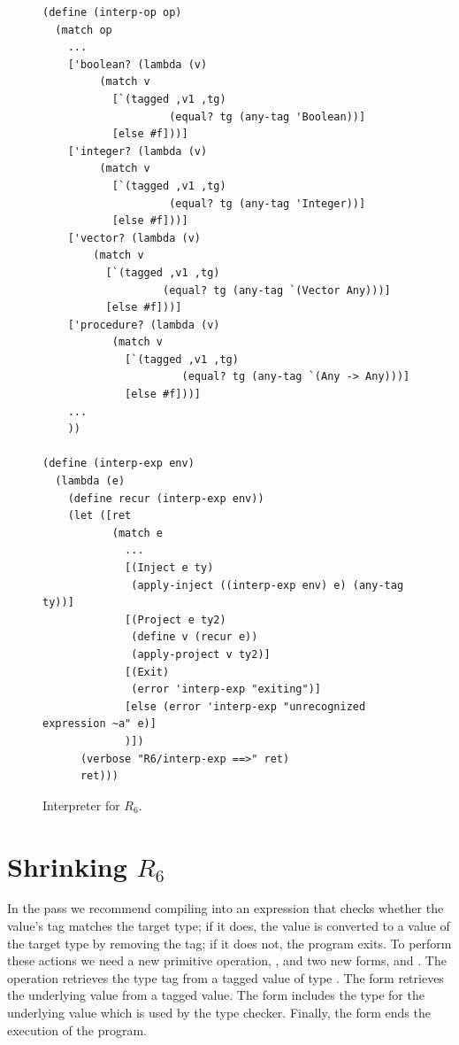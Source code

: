 \documentclass[11pt]{book}
\begin{document}
\begin{figure}[btp]
\begin{lstlisting}
(define (interp-op op)
  (match op
    ...
    ['boolean? (lambda (v)
		 (match v
		   [`(tagged ,v1 ,tg)
                    (equal? tg (any-tag 'Boolean))]
		   [else #f]))]
    ['integer? (lambda (v)
		 (match v
		   [`(tagged ,v1 ,tg)
                    (equal? tg (any-tag 'Integer))]
		   [else #f]))]
    ['vector? (lambda (v)
		(match v
		  [`(tagged ,v1 ,tg)
                   (equal? tg (any-tag `(Vector Any)))]
		  [else #f]))]
    ['procedure? (lambda (v)
		   (match v
		     [`(tagged ,v1 ,tg)
                      (equal? tg (any-tag `(Any -> Any)))]
		     [else #f]))]
    ...
    ))

(define (interp-exp env)
  (lambda (e)
    (define recur (interp-exp env))
    (let ([ret
           (match e
             ...
             [(Inject e ty)
              (apply-inject ((interp-exp env) e) (any-tag ty))]
             [(Project e ty2)
              (define v (recur e))
              (apply-project v ty2)]
             [(Exit)
              (error 'interp-exp "exiting")]
             [else (error 'interp-exp "unrecognized expression ~a" e)]
             )])
      (verbose "R6/interp-exp ==>" ret)
      ret)))
\end{lstlisting}
\caption{Interpreter for $R_6$.}
\label{fig:interp-R6}
\end{figure}


\section{Shrinking $R_6$}
\label{sec:shrink-r6}


In the  pass we recommend compiling  into
an  expression that checks whether the value's tag matches
the target type; if it does, the value is converted to a value of the
target type by removing the tag; if it does not, the program exits.
To perform these actions we need a new primitive operation,
, and two new forms,  and .
The  operation retrieves the type tag from a tagged
value of type .  The  form retrieves the
underlying value from a tagged value.  The  form
includes the type for the underlying value which is used by the type
checker.  Finally, the  form ends the execution of the
program.
\end{document}
